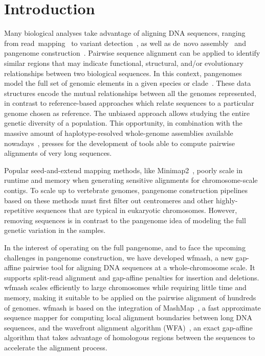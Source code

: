 \documentclass{bioinfo}
\theoremstyle{definition}
\begin{document}
\maketitle

\section{Introduction}
\label{sec:introduction}
Many biological analyses take advantage of aligning DNA sequences, ranging from read~mapping~\citep{Langmead2012, li2013aligning, MarcoSola2012} to variant detection~\citep{DePristo2011}, as well as de~novo assembly~\citep{Simpson2009} and pangenome construction~\citep{Armstrong2020, Li2020, pggb}.
Pairwise sequence alignment can be applied to identify similar regions that may indicate functional, structural, and/or evolutionary relationships between two biological sequences.
In this context, pangenomes model the full set of genomic elements in a given species or clade~\citep{Eizenga_2020}.
These data structures encode the mutual relationships between all the genomes represented, in contrast to reference-based approaches which relate sequences to a particular genome chosen as reference.
The unbiased approach allows studying the entire genetic diversity of a population.
This opportunity, in combination with the massive amount of haplotype-resolved whole-genome assemblies available nowadays~\citep{Garg_2020}, presses for the development of tools able to compute pairwise alignments of very long sequences.

Popular seed-and-extend mapping methods, like Minimap2~\citep{Li_2018}, poorly scale in runtime and memory when generating sensitive alignments for chromosome-scale contigs.
To scale up to vertebrate genomes, pangenome construction pipelines based on these methods must first filter out centromeres and other highly-repetitive sequences that are typical in eukaryotic chromosomes.
However, removing sequences is in contrast to the pangenome idea of modeling the full genetic variation in the samples.

In the interest of operating on the full pangenome, and to face the upcoming challenges in pangenome construction, we have developed wfmash, a new gap-affine pairwise tool for aligning DNA sequences at a whole-chromosome scale.
It supports split-read alignment and gap-affine penalties for insertion and deletions.
wfmash scales efficiently to large chromosomes while requiring little time and memory, making it suitable to be applied on the pairwise alignment of hundreds of genomes.
wfmash is based on the integration of MashMap~\citep{Jain_2018}, a fast approximate sequence mapper for computing local alignment boundaries between long DNA sequences, and the wavefront alignment algorithm (WFA)~\citep{Marco_Sola_2020}, an exact gap-affine algorithm that takes advantage of homologous regions between the sequences to accelerate the alignment process.
\end{document}
